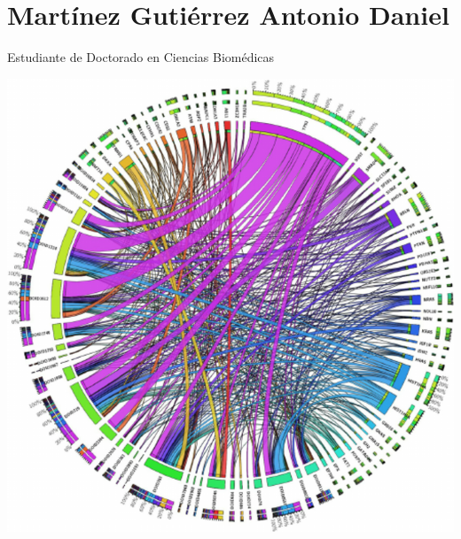 \chapter{Martínez Gutiérrez Antonio Daniel}

Estudiante de Doctorado en Ciencias Biomédicas

\includegraphics[scale=0.3]{./310096593/microRNA.png}

